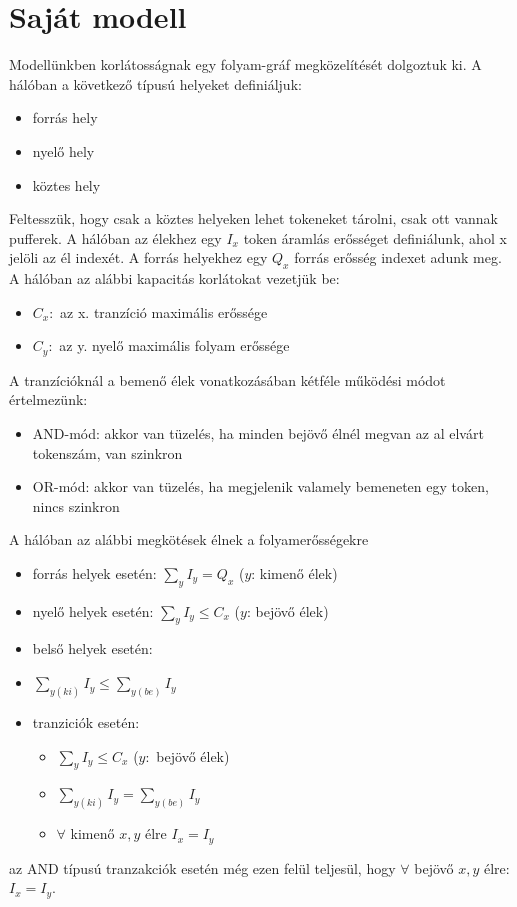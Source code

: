 \documentclass[12pt,a4paper]{book}
\begin{document}

\section{Saját modell}

Modellünkben korlátosságnak egy folyam-gráf megközelítését dolgoztuk ki.  A hálóban a következő típusú helyeket definiáljuk:
\begin{itemize}
\item forrás hely
\item nyelő hely
\item köztes hely
\end{itemize}
Feltesszük, hogy csak a köztes helyeken lehet tokeneket tárolni, csak ott vannak pufferek. A hálóban az élekhez egy $I_x$ token áramlás erősséget definiálunk, ahol x jelöli az él indexét. A forrás helyekhez egy $Q_x$ forrás erősség indexet adunk meg. A hálóban az alábbi kapacitás korlátokat vezetjük be:
\begin{itemize}
\item $C_x:$ az x. tranzíció maximális erőssége 
\item $C_y:$ az y. nyelő maximális folyam erőssége 
\end{itemize}

A tranzícióknál a bemenő élek vonatkozásában kétféle működési módot értelmezünk:
\begin{itemize}
\item AND-mód: akkor van tüzelés, ha minden bejövő élnél megvan az al elvárt tokenszám, van szinkron
\item OR-mód: akkor van tüzelés, ha megjelenik valamely bemeneten egy token, nincs szinkron  
\end{itemize}
A hálóban az alábbi megkötések élnek a folyamerősségekre
\begin{itemize}
\item forrás helyek esetén: $\sum_y I_y=Q_x$ ($y$: kimenő élek)
\item nyelő helyek esetén: $\sum_y I_y \leq C_x$ ($y$: bejövő élek)
\item belső helyek esetén: 
\item$\sum_{y(ki)} I_y\leq \sum_{y(be)} I_y$
\item tranziciók esetén: 
\begin{itemize}
\item $\sum_y I_y\leq C_x$ ($y:$ bejövő élek)
\item $\sum_{y(ki)} I_y = \sum_{y(be)} I_y$
\item $\forall$ kimenő $x,y$ élre $I_x=I_y$
\end{itemize}
\end{itemize}
az AND típusú tranzakciók esetén még ezen felül teljesül, hogy $\forall$ bejövő $x,y$ élre:\\
$I_x = I_y$.
\end{document}
